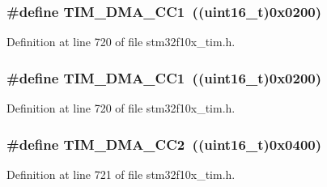 \subsubsection[{\texorpdfstring{T\+I\+M\+\_\+\+D\+M\+A\+\_\+\+C\+C1}{TIM_DMA_CC1}}]{\setlength{\rightskip}{0pt plus 5cm}\#define T\+I\+M\+\_\+\+D\+M\+A\+\_\+\+C\+C1~(({\bf uint16\+\_\+t})0x0200)}\hypertarget{group___t_i_m___d_m_a__sources_ga33b93e8bb82fe8e167b9e9c962c54f83}{}\label{group___t_i_m___d_m_a__sources_ga33b93e8bb82fe8e167b9e9c962c54f83}


Definition at line 720 of file stm32f10x\+\_\+tim.\+h.

\subsubsection[{\texorpdfstring{T\+I\+M\+\_\+\+D\+M\+A\+\_\+\+C\+C1}{TIM_DMA_CC1}}]{\setlength{\rightskip}{0pt plus 5cm}\#define T\+I\+M\+\_\+\+D\+M\+A\+\_\+\+C\+C1~(({\bf uint16\+\_\+t})0x0200)}\hypertarget{group___t_i_m___d_m_a__sources_ga33b93e8bb82fe8e167b9e9c962c54f83}{}\label{group___t_i_m___d_m_a__sources_ga33b93e8bb82fe8e167b9e9c962c54f83}


Definition at line 720 of file stm32f10x\+\_\+tim.\+h.

\subsubsection[{\texorpdfstring{T\+I\+M\+\_\+\+D\+M\+A\+\_\+\+C\+C2}{TIM_DMA_CC2}}]{\setlength{\rightskip}{0pt plus 5cm}\#define T\+I\+M\+\_\+\+D\+M\+A\+\_\+\+C\+C2~(({\bf uint16\+\_\+t})0x0400)}\hypertarget{group___t_i_m___d_m_a__sources_ga792f73196a8e7424655592097d7a3fd5}{}\label{group___t_i_m___d_m_a__sources_ga792f73196a8e7424655592097d7a3fd5}


Definition at line 721 of file stm32f10x\+\_\+tim.\+h.

